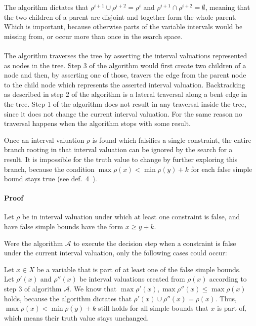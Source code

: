 The algorithm dictates that $\rho^{i+1} \cup \rho^{i+2} = \rho^i$ and $\rho^{i+1} \cap \rho^{i+2} = \emptyset$, meaning that the two children of a parent are disjoint and together form the whole parent.
Which is important, because otherwise parts of the variable intervals would be missing from, or occur more than once in the search space.

\paragraph{}
The algorithm traverses the tree by asserting the interval valuations represented as nodes in the tree.
Step 3 of the algorithm would first create two children of a node and then, by asserting one of those, travers the edge from the parent node to the child node which represents the asserted interval valuation.
Backtracking as described in step 2 of the algorithm is a lateral traversal along a bent edge in the tree.
Step 1 of the algorithm does not result in any traversal inside the tree, since it does not change the current interval valuation.
For the same reason no traversal happens when the algorithm stops with some result.

\begin{lemma}\label{lemma:false-branches}
    Once an interval valuation $\rho$ is found which falsifies a single constraint, the entire branch rooting in that interval valuation can be ignored by the search for a result.
    It is impossible for the truth value to change by further exploring this branch, because the condition $\max \rho(x) < \min \rho(y) + k$ for each false simple bound stays true (see def.~4~\cite{MF19}). 
\end{lemma}


\paragraph{Proof}

Let $\rho$ be in interval valuation under which at least one constraint is false, and have false simple bounds have the form $x \geq y + k$.

Were the algorithm $\mathcal{A}$ to execute the decision step when a constraint is false under the current interval valuation, only the following cases could occur:

Let $x \in X$ be a variable that is part of at least one of the false simple bounds.
Let $\rho'(x)$ and $\rho''(x)$ be interval valuations created from $\rho(x)$ according to step 3 of algorithm $\mathcal{A}$.
We know that $\max \rho'(x), \max \rho''(x) \leq \max \rho(x)$ holds, because the algorithm dictates that $\rho'(x) \cup \rho''(x) = \rho(x)$.
Thus, $\max \rho(x) < \min \rho(y) + k$ still holds for all simple bounds that $x$ is part of, which means their truth value stays unchanged.

